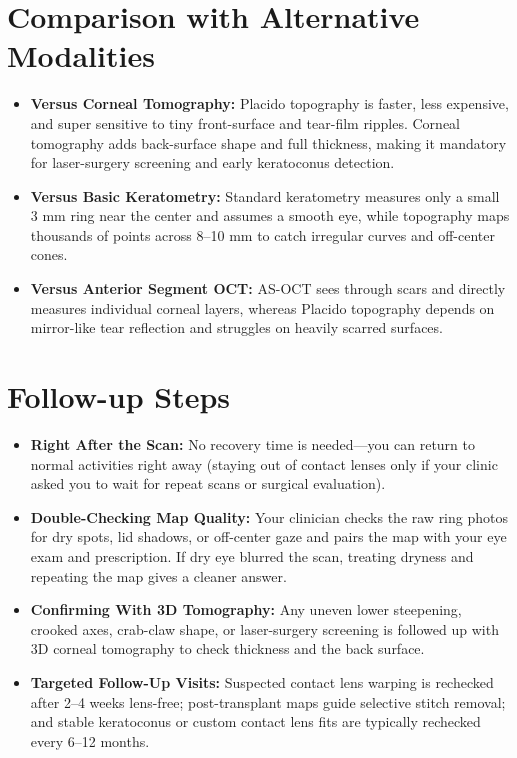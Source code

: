\section{Comparison with Alternative Modalities}
\begin{itemize}
    \item \textbf{Versus Corneal Tomography:} Placido topography is faster, less expensive, and super sensitive to tiny front-surface and tear-film ripples. Corneal tomography adds back-surface shape and full thickness, making it mandatory for laser-surgery screening and early keratoconus detection.
    \item \textbf{Versus Basic Keratometry:} Standard keratometry measures only a small 3 mm ring near the center and assumes a smooth eye, while topography maps thousands of points across 8--10 mm to catch irregular curves and off-center cones.
    \item \textbf{Versus Anterior Segment OCT:} AS-OCT sees through scars and directly measures individual corneal layers, whereas Placido topography depends on mirror-like tear reflection and struggles on heavily scarred surfaces.
\end{itemize}

\section{Follow-up Steps}
\begin{itemize}
    \item \textbf{Right After the Scan:} No recovery time is needed---you can return to normal activities right away (staying out of contact lenses only if your clinic asked you to wait for repeat scans or surgical evaluation).
    \item \textbf{Double-Checking Map Quality:} Your clinician checks the raw ring photos for dry spots, lid shadows, or off-center gaze and pairs the map with your eye exam and prescription. If dry eye blurred the scan, treating dryness and repeating the map gives a cleaner answer.
    \item \textbf{Confirming With 3D Tomography:} Any uneven lower steepening, crooked axes, crab-claw shape, or laser-surgery screening is followed up with 3D corneal tomography to check thickness and the back surface.
    \item \textbf{Targeted Follow-Up Visits:} Suspected contact lens warping is rechecked after 2--4 weeks lens-free; post-transplant maps guide selective stitch removal; and stable keratoconus or custom contact lens fits are typically rechecked every 6--12 months.
\end{itemize}

